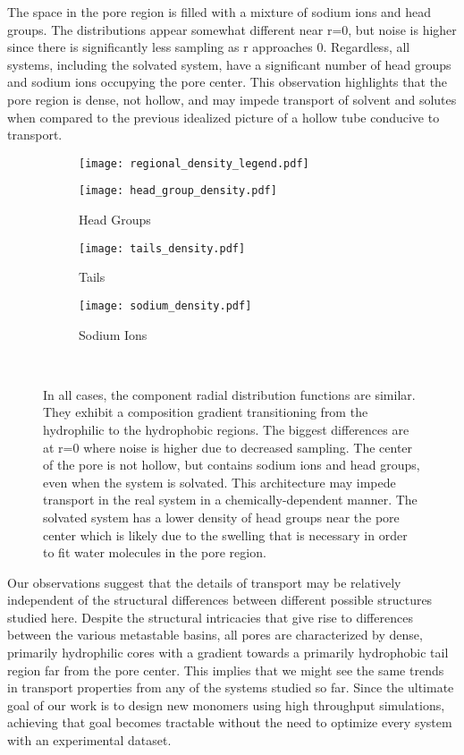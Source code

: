   The space in the pore region is filled with a mixture of sodium ions
  and head groups. The distributions appear somewhat different near r=0, but noise 
  is higher since there is significantly less sampling as r approaches 0. Regardless, 
  all systems, including the solvated system, have a significant number of head groups 
  and sodium ions occupying the pore center. This observation highlights that the pore
  region is dense, not hollow, and may impede transport of solvent and solutes when
  compared to the previous idealized picture of a hollow tube conducive to transport.
  
  \begin{figure}[!htb]
  \centering
  \begin{subfigure}{\textwidth}
  \texttt{[image: regional\_density\_legend.pdf]}
  \end{subfigure}
  \begin{subfigure}{0.32\textwidth}
        \texttt{[image: head\_group\_density.pdf]}
        \caption{Head Groups}
        \label{fig:head_groups_regional_density}
  \end{subfigure}
  \begin{subfigure}{0.32\textwidth}
        \texttt{[image: tails\_density.pdf]}
        \caption{Tails}
        \label{fig:tails_regional_density}
  \end{subfigure}
  \begin{subfigure}{0.32\textwidth}
        \texttt{[image: sodium\_density.pdf]}
        \caption{Sodium Ions}
        \label{fig:sodium_regional_density}
  \end{subfigure}
  \caption{In all cases, the component radial distribution functions are similar. 
      They exhibit a composition gradient transitioning from the hydrophilic to the hydrophobic
	  regions. The biggest differences are at r=0 where noise is higher due to 
	  decreased sampling. The center of the pore is not hollow, but contains sodium ions and 
	  head groups, even when the system is solvated. This architecture may impede transport in 
	  the real system in a chemically-dependent manner. 
          The solvated system has a lower density of head groups near the 
	  pore center which is likely due to the swelling that is necessary in order to fit water
	  molecules in the pore region.}~\label{fig:overlaid_densities}
  \end{figure}

  \label{addition:pore_composition}
  Our observations suggest that the details of transport may be relatively 
  independent of the structural differences between different possible structures
  studied here. Despite the structural intricacies that give rise to differences
  between the various metastable basins, all pores are characterized by dense, 
  primarily hydrophilic cores with a gradient towards a primarily hydrophobic 
  tail region far from the pore center. This implies that we might see the same
  trends in transport properties from any of the systems studied so far. Since the
  ultimate goal of our work is to design new monomers using high throughput 
  simulations, achieving that goal becomes tractable without the need to optimize
  every system with an experimental dataset.

